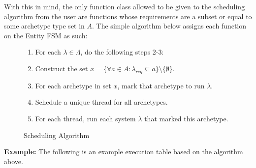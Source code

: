 With this in mind, the only function class allowed to be given to the scheduling algorithm from the user are functions whose requirements are a subset or equal to some archetype type set in $A$. The simple algorithm below assigns each function on the Entity FSM as such:

\begin{figure}[H]
    \begin{enumerate}
        \item For each $\lambda \in \Lambda$, do the following steps 2-3:
        \item Construct the set $x = \{\forall a \in A : \lambda_{req} \subseteq a \} \setminus \{\emptyset\}$.
        \item For each archetype in set $x$, mark that archetype to run $\lambda$.
        \item Schedule a unique thread for all archetypes.
        \item For each thread, run each system $\lambda$ that marked this archetype.
    \end{enumerate}
    \caption{Scheduling Algorithm}
\end{figure}

\textbf{Example:} The following is an example execution table based on the algorithm above.

